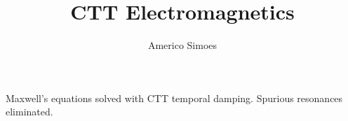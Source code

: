 \documentclass[12pt]{article}
\begin{document}
\title{CTT Electromagnetics}
\author{Americo Simoes}
\maketitle
Maxwell's equations solved with CTT temporal damping. Spurious resonances eliminated.
\end{document}
